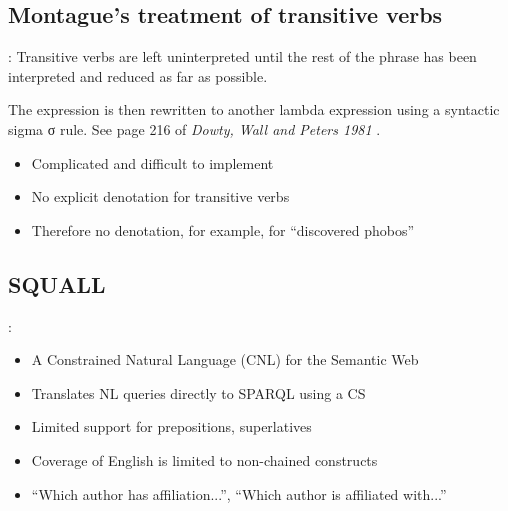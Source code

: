 \documentclass[logoontitle,tabu,supertabular,aspectratio=43]{preney-uwindsor-beamer}
\begin{document}
    \subsection{Montague’s treatment of transitive verbs}
    \begin{frame}{\insertsection: \insertsubsection}
        Transitive verbs are left uninterpreted until the rest of the phrase has been interpreted and reduced as far as possible.

        The expression is then rewritten to another lambda expression using a syntactic
        sigma σ rule. See page 216 of \textit{Dowty, Wall and Peters 1981}\cite{Dowty:wall} .

        \begin{itemize}
            \item Complicated and difficult to implement

            \item No explicit denotation for transitive verbs

            \item Therefore no denotation, for example, for ``discovered phobos''
        \end{itemize}
    \end{frame}


    \subsection{SQUALL}
    \begin{frame}{\insertsection: \insertsubsection}
        \begin{itemize}
            \item A Constrained Natural Language (CNL) for the Semantic Web
            \item Translates NL queries directly to SPARQL using a CS
            \item Limited support for prepositions, superlatives
            \item Coverage of English is limited to non-chained constructs
            \item ``Which author has affiliation...'', ``Which author is affiliated with...''
        \end{itemize}
    \end{frame}

\end{document}
